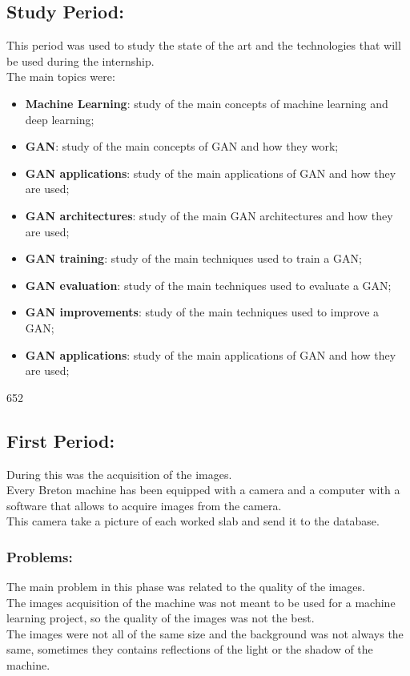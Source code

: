 \subsection{Study Period:}
This period was used to study the state of the art and the technologies that will be used during the internship.\\
The main topics were:
\begin{itemize}
    \item \textbf{Machine Learning}: study of the main concepts of machine learning and deep learning;
    \item \textbf{GAN}: study of the main concepts of GAN and how they work;
    \item \textbf{GAN applications}: study of the main applications of GAN and how they are used;
    \item \textbf{GAN architectures}: study of the main GAN architectures and how they are used;
    \item \textbf{GAN training}: study of the main techniques used to train a GAN;
    \item \textbf{GAN evaluation}: study of the main techniques used to evaluate a GAN;
    \item \textbf{GAN improvements}: study of the main techniques used to improve a GAN;
    \item \textbf{GAN applications}: study of the main applications of GAN and how they are used;
\end{itemize}
652
\subsection{First Period:}
During this was the acquisition of the images.\\
Every Breton machine has been equipped with a camera and a computer with a software that allows to acquire images from the camera.\\
This camera take a picture of each worked slab and send it to the database.\\
\subsubsection{Problems:}
The main problem in this phase was related to the quality of the images.\\
The images acquisition of the machine was not meant to be used for a machine learning project, so the quality of the images was not the best.\\
The images were not all of the same size and the background was not always the same, sometimes they contains reflections of the light or the shadow of the machine.\\

